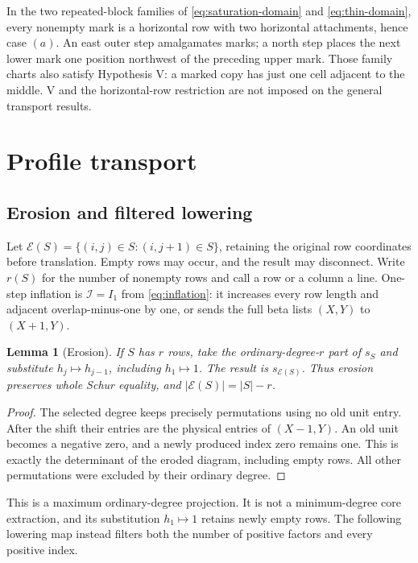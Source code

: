 \documentclass[11pt,a4paper]{amsart}
\numberwithin{equation}{section}
\theoremstyle{plain}
\newtheorem{lemma}[theorem]{Lemma}
\theoremstyle{definition}
\begin{document}
In the two repeated-block families of
\eqref{eq:saturation-domain} and \eqref{eq:thin-domain}, every nonempty mark is a
horizontal row with two horizontal attachments, hence case \((a)\).
An east outer step amalgamates marks; a north step places the next lower
mark one position northwest of the preceding upper mark.  Those family
charts also satisfy Hypothesis V: a marked copy has just one cell
adjacent to the middle.  V and the horizontal-row restriction are not
imposed on the general transport results.

\section{Profile transport}\label{sec:profile-transport}

\subsection{Erosion and filtered lowering}

Let \(\mathcal E(S)=\{(i,j)\in S:(i,j+1)\in S\}\), retaining
the original row coordinates before translation.  Empty rows may occur,
and the result may disconnect.  Write \(r(S)\) for the number of
nonempty rows and call a row or a column a line.  One-step inflation is
\(\mathcal I=I_1\) from \eqref{eq:inflation}: it increases every row
length and adjacent overlap-minus-one by one, or sends the full beta
lists \((X,Y)\) to \((X+1,Y)\).

\begin{lemma}[Erosion]\label{lem:erosion}
If \(S\) has \(r\) rows, take the ordinary-degree-\(r\) part of \(s_S\) and substitute
\(h_j\mapsto h_{j-1}\), including \(h_1\mapsto1\).  The result is
\(s_{\mathcal E(S)}\).  Thus erosion preserves whole Schur equality, and
\(|\mathcal E(S)|=|S|-r\).
\end{lemma}
\begin{proof}
The selected degree keeps precisely permutations using no old unit entry.
After the shift their entries are the physical entries of \((X-1,Y)\).
An old unit becomes a negative zero, and a newly produced index zero remains
one.  This is exactly the determinant of the eroded diagram, including empty
rows.  All other permutations were excluded by their ordinary degree.
\end{proof}

This is a maximum ordinary-degree projection.  It is not a
minimum-degree core extraction, and its substitution \(h_1\mapsto1\)
retains newly empty rows.  The following lowering map instead filters
both the number of positive factors and every positive index.
\end{document}
